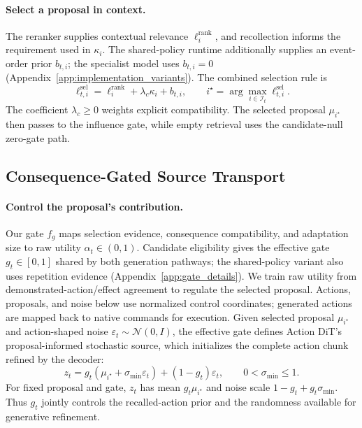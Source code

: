 \paragraph{Select a proposal in context.}
The reranker supplies contextual relevance $\ell_i^{\mathrm{rank}}$, and recollection informs the requirement used in $\kappa_i$.
The shared-policy runtime additionally supplies an event-order prior $b_{t,i}$; the specialist model uses $b_{t,i}=0$ (Appendix~\ref{app:implementation_variants}).
The combined selection rule is
\begin{equation}
 \ell_{t,i}^{\mathrm{sel}}=\ell_i^{\mathrm{rank}}+\lambda_c\kappa_i+b_{t,i},\qquad
 i^\star=\arg\max_{i\in\mathcal I_t}\ell_{t,i}^{\mathrm{sel}}.
 \label{eq:selection}
\end{equation}
The coefficient $\lambda_c\geq0$ weights explicit compatibility.
The selected proposal $\mu_{i^\star}$ then passes to the influence gate, while empty retrieval uses the candidate-null zero-gate path.

\subsection{Consequence-Gated Source Transport}
\label{sec:reuse}

\paragraph{Control the proposal's contribution.}
Our gate $f_g$ maps selection evidence, consequence compatibility, and adaptation size to raw utility $\alpha_t\in(0,1)$.
Candidate eligibility gives the effective gate $g_t\in[0,1]$ shared by both generation pathways; the shared-policy variant also uses repetition evidence (Appendix~\ref{app:gate_details}).
We train raw utility from demonstrated-action/effect agreement to regulate the selected proposal.
Actions, proposals, and noise below use normalized control coordinates; generated actions are mapped back to native commands for execution.
Given selected proposal $\mu_{i^\star}$ and action-shaped noise $\varepsilon_t\sim\mathcal N(0,I)$, the effective gate defines Action DiT's proposal-informed stochastic source, which initializes the complete action chunk refined by the decoder:
\begin{equation}
 z_t=g_t(\mu_{i^\star}+\sigma_{\min}\varepsilon_t)+(1-g_t)\varepsilon_t,
 \qquad 0<\sigma_{\min}\leq1.
 \label{eq:source}
\end{equation}
For fixed proposal and gate, $z_t$ has mean $g_t\mu_{i^\star}$ and noise scale $1-g_t+g_t\sigma_{\min}$.
Thus $g_t$ jointly controls the recalled-action prior and the randomness available for generative refinement.


